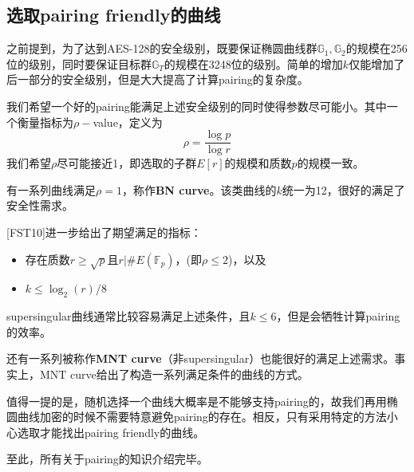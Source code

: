 \documentclass[12pt]{article}
\newcommand{\ec}{椭圆曲线}
\newcommand{\fp}{\mathbb{F}_p}
\begin{document}
\subsection{选取pairing friendly的曲线}
之前提到，为了达到AES-128的安全级别，既要保证\ec 群$\mathbb{G}_1,\mathbb{G}_2$的规模在256位的级别，同时要保证目标群$\mathbb{G}_T$的规模在3248位的级别。简单的增加$k$仅能增加了后一部分的安全级别，但是大大提高了计算pairing的复杂度。

我们希望一个好的pairing能满足上述安全级别的同时使得参数尽可能小。其中一个衡量指标为$\rho-$value，定义为
$$ \rho = \frac{\log p}{\log r}$$
我们希望$\rho$尽可能接近1，即选取的子群$E[r]$的规模和质数$p$的规模一致。

有一系列曲线满足$\rho=1$，称作\textbf{BN curve}。该类曲线的$k$统一为12，很好的满足了安全性需求。

[FST10]进一步给出了期望满足的指标：
\begin{itemize}
	\item 存在质数$r \geq \sqrt{p}$且$r| \# E(\fp)$，(即$\rho \leq 2$)，以及
	\item $k \leq \log_2(r)/8$
\end{itemize}
supersingular曲线通常比较容易满足上述条件，且$k \leq 6$，但是会牺牲计算pairing的效率。

还有一系列被称作\textbf{MNT curve}（非supersingular）也能很好的满足上述需求。事实上，MNT curve给出了构造一系列满足条件的曲线的方式。

值得一提的是，随机选择一个曲线大概率是不能够支持pairing的，故我们再用\ec 加密的时候不需要特意避免pairing的存在。相反，只有采用特定的方法小心选取才能找出pairing friendly的曲线。

至此，所有关于pairing的知识介绍完毕。
\newpage
\begin{appendices}
%
\end{appendices}
\end{document}
